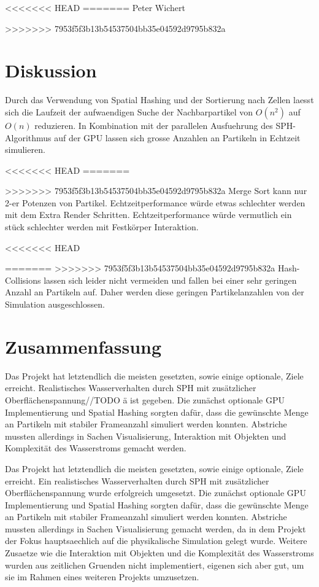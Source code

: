 \documentclass[a4paper]{paper}
\begin{document}
<<<<<<< HEAD
=======
Peter Wichert
\fi





>>>>>>> 7953f5f3b13b54537504bb35e04592d9795b832a
\section{Diskussion}
Durch das Verwendung von Spatial Hashing und der Sortierung nach Zellen laesst sich die Laufzeit der aufwaendigen Suche der Nachbarpartikel von $O(n^2)$ auf $O(n)$ reduzieren.
In Kombination mit der parallelen Ausfuehrung des SPH-Algorithmus auf der GPU lassen sich grosse Anzahlen an Partikeln in Echtzeit simulieren.

<<<<<<< HEAD
=======

>>>>>>> 7953f5f3b13b54537504bb35e04592d9795b832a
Merge Sort kann nur 2-er Potenzen von Partikel.
Echtzeitperformance würde etwas schlechter werden mit dem Extra Render Schritten.
Echtzeitperformance würde vermutlich ein stück schlechter werden mit Festkörper Interaktion. 

<<<<<<< HEAD

=======
>>>>>>> 7953f5f3b13b54537504bb35e04592d9795b832a
Hash-Collisions lassen sich leider nicht vermeiden und fallen bei einer sehr geringen Anzahl an Partikeln auf. Daher werden diese geringen Partikelanzahlen von der Simulation ausgeschlossen.
\section{Zusammenfassung}
Das Projekt hat letztendlich die meisten gesetzten, sowie einige optionale, Ziele erreicht. Realistisches Wasserverhalten durch SPH mit zusätzlicher Oberflächenspannung//TODO ä ist gegeben. Die zunächst optionale GPU Implementierung und Spatial Hashing sorgten dafür, dass die gewünschte Menge an Partikeln mit stabiler Frameanzahl simuliert werden konnten. Abstriche mussten allerdings in Sachen Visualisierung, Interaktion mit Objekten und Komplexität des Wasserstroms gemacht werden.



Das Projekt hat letztendlich die meisten gesetzten, sowie einige optionale, Ziele erreicht. Ein realistisches Wasserverhalten durch SPH mit zusätzlicher Oberflächenspannung wurde erfolgreich umgesetzt. Die zunächst optionale GPU Implementierung und Spatial Hashing sorgten dafür, dass die gewünschte Menge an Partikeln mit stabiler Frameanzahl simuliert werden konnten. Abstriche mussten allerdings in Sachen Visualisierung gemacht werden, da in dem Projekt der Fokus hauptsaechlich auf die physikalische Simulation gelegt wurde. Weitere Zusaetze wie die Interaktion mit Objekten und die Komplexität des Wasserstroms wurden aus zeitlichen Gruenden nicht implementiert, eigenen sich aber gut, um sie im Rahmen eines weiteren Projekts umzusetzen.




\end{document}
